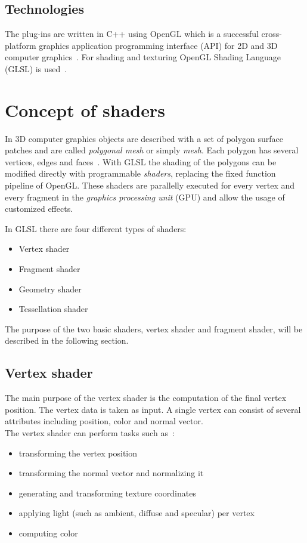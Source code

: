 \subsection{Technologies}
The plug-ins are written in C++ using OpenGL which is a successful cross-platform graphics application programming interface (API) for 2D and 3D computer graphics~\cite{book:computerGraphicsHill}. For shading and texturing OpenGL Shading Language (GLSL) is used~\cite{misc:volumeshop101}.

\section{Concept of shaders}

In 3D computer graphics objects are described with a set of polygon surface patches and are called \emph{polygonal mesh} or simply \emph{mesh}. Each polygon has several vertices, edges and faces~\cite{book:computerGraphicsHearn}. With GLSL the shading of the polygons can be modified directly with programmable \emph{shaders}, replacing the fixed function pipeline of OpenGL. These shaders are parallelly executed for every vertex and every fragment in the \emph{graphics processing unit} (GPU) and allow the usage of customized effects.

In GLSL there are four different types of shaders:
\begin{itemize}
	\item Vertex shader
	\item Fragment shader
	\item Geometry shader
	\item Tessellation shader
\end{itemize}
The purpose of the two basic shaders, vertex shader and fragment shader, will be described in the following section.\\

\subsection{Vertex shader}
The main purpose of the vertex shader is the computation of the final vertex position. The vertex data is taken as input. A single vertex can consist of several attributes including position, color and normal vector.\\
The vertex shader can perform tasks such as~\cite{book:computerGraphicsHill}: %
\begin{itemize}
	\item transforming the vertex position
	\item transforming the normal vector and normalizing it
	\item generating and transforming texture coordinates
	\item applying light (such as ambient, diffuse and specular) per vertex
	\item computing color
\end{itemize}

